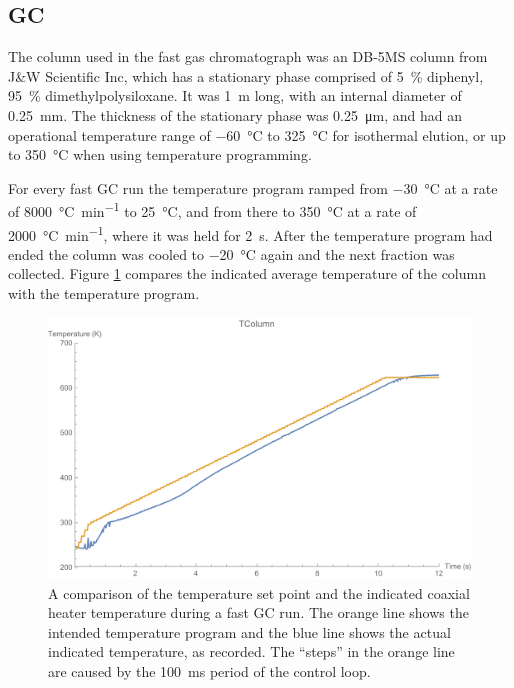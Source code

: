 \subsection{GC}

The column used in the fast gas chromatograph was an DB-5MS column from J\&W
Scientific Inc, which has a stationary phase comprised of \SI{5}{\percent}
diphenyl, \SI{95}{\percent} di\-meth\-yl\-poly\-si\-lox\-ane. It was \SI{1}{\metre} long,
with an internal diameter of \SI{0.25}{\milli\metre}. The thickness of the
stationary phase was \SI{0.25}{\micro\metre}, and had an operational temperature
range of \SI{-60}{\celsius} to \SI{325}{\celsius} for isothermal elution, or up
to \SI{350}{\celsius} when using temperature programming.

For every fast GC run the temperature program ramped from \SI{-30}{\celsius} at a
rate of \SI{8000}{\celsius\per\minute} to \SI{25}{\celsius}, and from there to
\SI{350}{\celsius} at a rate of \SI{2000}{\celsius\per\minute}, where it was
held for \SI{2}{s}. After the temperature program had ended the column was
cooled to \SI{-20}{\celsius} again and the next fraction was collected. Figure
\ref{fig:Setpoint_Following} compares the indicated average temperature of the
column with the temperature program.

\begin{figure}
	\centering
	\includegraphics[width=\textwidth]{Figures/Setpoint_Following.pdf}
	\decoRule	
	
\caption[The fidelity of a fast GC temperature program]{A comparison of the
temperature set point and the indicated coaxial heater temperature during a fast
GC run. The orange line shows the intended temperature program and the blue line
shows the actual indicated temperature, as recorded. The ``steps'' in the orange
line are caused by the \SI{100}{\milli\second} period of the control loop.}

	\label{fig:Setpoint_Following} 
\end{figure}

